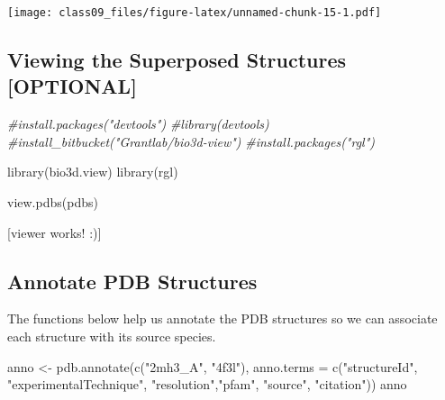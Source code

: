 \documentclass[
]{article}
\newenvironment{Shaded}{\begin{snugshade}}{\end{snugshade}}
\newcommand{\AttributeTok}[1]{\textcolor[rgb]{0.77,0.63,0.00}{#1}}
\newcommand{\CommentTok}[1]{\textcolor[rgb]{0.56,0.35,0.01}{\textit{#1}}}
\newcommand{\FunctionTok}[1]{\textcolor[rgb]{0.00,0.00,0.00}{#1}}
\newcommand{\NormalTok}[1]{#1}
\newcommand{\OtherTok}[1]{\textcolor[rgb]{0.56,0.35,0.01}{#1}}
\newcommand{\SpecialCharTok}[1]{\textcolor[rgb]{0.00,0.00,0.00}{#1}}
\newcommand{\StringTok}[1]{\textcolor[rgb]{0.31,0.60,0.02}{#1}}
\begin{document}
\begin{Shaded}
\end{Shaded}

\texttt{[image: class09\_files/figure-latex/unnamed-chunk-15-1.pdf]}

\hypertarget{viewing-the-superposed-structures-optional}{%
\subsection{Viewing the Superposed Structures
{[}OPTIONAL{]}}\label{viewing-the-superposed-structures-optional}}

\begin{Shaded}
\begin{Highlighting}[]
\CommentTok{\#install.packages("devtools")}
\CommentTok{\#library(devtools)}
\CommentTok{\#install\_bitbucket("Grantlab/bio3d{-}view")}
\CommentTok{\#install.packages("rgl")}

\FunctionTok{library}\NormalTok{(bio3d.view)}
\FunctionTok{library}\NormalTok{(rgl)}

\FunctionTok{view.pdbs}\NormalTok{(pdbs)}
\end{Highlighting}
\end{Shaded}

{[}viewer works! :){]}

\hypertarget{annotate-pdb-structures}{%
\subsection{Annotate PDB Structures}\label{annotate-pdb-structures}}

The functions below help us annotate the PDB structures so we can
associate each structure with its source species.

\begin{Shaded}
\begin{Highlighting}[]
\NormalTok{anno }\OtherTok{\textless{}{-}} \FunctionTok{pdb.annotate}\NormalTok{(}\FunctionTok{c}\NormalTok{(}\StringTok{"2mh3\_A"}\NormalTok{, }\StringTok{"4f3l"}\NormalTok{), }\AttributeTok{anno.terms =} \FunctionTok{c}\NormalTok{(}\StringTok{"structureId"}\NormalTok{, }\StringTok{"experimentalTechnique"}\NormalTok{, }\StringTok{"resolution"}\NormalTok{,}\StringTok{"pfam"}\NormalTok{, }\StringTok{"source"}\NormalTok{, }\StringTok{"citation"}\NormalTok{))}
\NormalTok{anno}
\end{Highlighting}
\end{Shaded}
\end{document}
